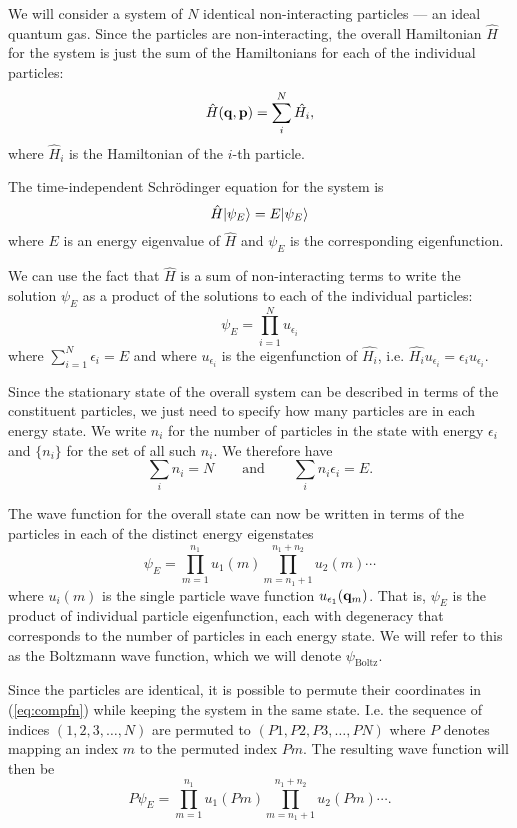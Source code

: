 We will consider a system of $N$ identical non-interacting particles --- an ideal quantum gas. Since the particles are non-interacting, the overall Hamiltonian $\hat{H}$ for the system is just the sum of the Hamiltonians for each of the individual particles:
$$
	\hat{H}({\bf q},{\bf p}) = \sum_i^N\hat{H_i},
$$
where $\hat{H}_i$ is the Hamiltonian of the $i$-th particle.

The time-independent Schr\"odinger equation for the system is
$$
	\hat{H}| \psi_E \rangle = E| \psi_E \rangle
$$
where $E$ is an energy eigenvalue of $\hat{H}$ and $\psi_E$ is the corresponding eigenfunction.

We can use the fact that $\hat{H}$ is a sum of non-interacting terms to write the solution $\psi_E$ as a product of the solutions to each of the individual particles: 
$$
	\psi_E = \prod_{i=1}^Nu_{\epsilon_i}
$$
where $\sum_{i=1}^N\epsilon_i = E$ and where $u_{\epsilon_i}$ is the eigenfunction of $\hat{H_i}$, i.e. $\hat{H_i}u_{\epsilon_i}={\epsilon_i}u_{\epsilon_i}$.

Since the stationary state of the overall system can be described in terms of the constituent particles, we just need to specify how many particles are in each energy state. We write $n_i$ for the number of particles in the state with energy $\epsilon_i$ and $\{n_i\}$ for the set of all such $n_i$. We therefore have
$$
	\sum_i n_i =N \qquad \text{and} \qquad \sum_in_i\epsilon_i = E.
$$

The wave function for the overall state can now be written in terms of the particles in each of the distinct energy eigenstates
\begin{equation}
	\psi_E = \prod_{m=1}^{n_1}u_1(m)\prod_{m=n_1+1}^{n_1+n_2}u_2(m)\cdots
	\label{eq:compfn}
\end{equation}
where $u_i(m)$ is the single particle wave function $u_{\epsilon_1}({\bf q}_m)$.
That is, $\psi_E$ is the product of individual particle eigenfunction, each with degeneracy that corresponds to the number of particles in each energy state.
We will refer to this as the Boltzmann wave function, which we will denote $\psi_\text{Boltz}$.

Since the particles are identical, it is possible to permute their coordinates in (\ref{eq:compfn}) while keeping the system in the same state. I.e. the sequence of indices $(1,2,3,\ldots,N)$ are permuted to $(P1,P2,P3,\ldots,PN)$ where $P$ denotes mapping an index $m$ to the permuted index $Pm$. The resulting wave function will then be
\begin{equation}
	P\psi_E = \prod_{m=1}^{n_1}u_1(Pm)\prod_{m=n_1+1}^{n_1+n_2}u_2(Pm)\cdots.
	\label{eq:permfn}
\end{equation}


